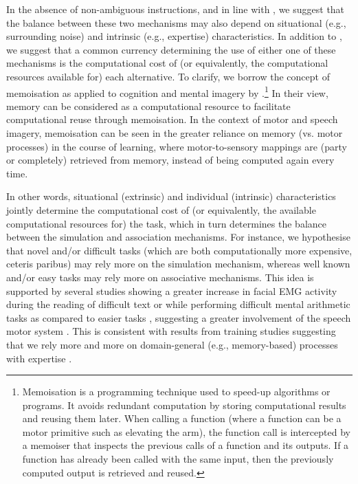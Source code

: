 \documentclass[utf8]{template/frontiersSCNS} %
\begin{document}
In the absence of non-ambiguous instructions, and in line with \cite{tian_mental_2012}, we suggest that the balance between these two mechanisms may also depend on situational (e.g., surrounding noise) and intrinsic (e.g., expertise) characteristics. In addition to \cite{tian_mental_2012}, we suggest that a common currency determining the use of either one of these mechanisms is the computational cost of (or equivalently, the computational resources available for) each alternative. To clarify, we borrow the concept of memoisation as applied to cognition and mental imagery by \cite{dasgupta_memory_2021}.\footnote{Memoisation is a programming technique used to speed-up algorithms or programs. It avoids redundant computation by storing computational results and reusing them later. When calling a function (where a function can be a motor primitive such as elevating the arm), the function call is intercepted by a memoiser that inspects the previous calls of a function and its outputs. If a function has already been called with the same input, then the previously computed output is retrieved and reused.} In their view, memory can be considered as a computational resource to facilitate computational reuse through memoisation. In the context of motor and speech imagery, memoisation can be seen in the greater reliance on memory (vs. motor processes) in the course of learning, where motor-to-sensory mappings are (party or completely) retrieved from memory, instead of being computed again every time.

In other words, situational (extrinsic) and individual (intrinsic) characteristics jointly determine the computational cost of (or equivalently, the available computational resources for) the task, which in turn determines the balance between the simulation and association mechanisms. For instance, we hypothesise that novel and/or difficult tasks (which are both computationally more expensive, ceteris paribus) may rely more on the simulation mechanism, whereas well known and/or easy tasks may rely more on associative mechanisms. This idea is supported by several studies showing a greater increase in facial EMG activity during the reading of difficult text or while performing difficult mental arithmetic tasks as compared to easier tasks \citep[e.g.,][]{faaborg-andersen_electromyography_1958, sokolov_inner_1972}, suggesting a greater involvement of the speech motor system \citep[and/or a lesser involvement of inhibitory mechanisms, see also the discussion in][]{nalborczyk_understanding_2019-1, nalborczyk_re-analysing_2020}. This is consistent with results from training studies suggesting that we rely more and more on domain-general (e.g., memory-based) processes with expertise \citep[e.g.,][]{tarr_mental_1989, jolicoeur_time_1985}.
\end{document}
